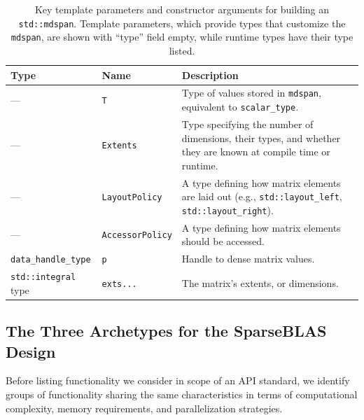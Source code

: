 \documentclass[manuscript,review]{acmart}
\begin{document}
\begin{table}[htbp]
  \centering
  \caption{Key template parameters and constructor arguments for building an \texttt{std::mdspan}. Template parameters, which provide types that customize the \texttt{mdspan}, are shown with ``type'' field empty, while runtime types have their type listed.}
  \label{tab:dense_param}
  \begin{tabularx}{\linewidth}{l l X}
    \toprule
    \textbf{Type} & \textbf{Name} & \textbf{Description} \\
    \midrule
    --- & \texttt{T} & Type of values stored in \texttt{mdspan}, equivalent to \texttt{scalar\_type}. \\
    --- & \texttt{Extents} & Type specifying the number of dimensions, their types, and whether they are known at compile time or runtime. \\
    --- & \texttt{LayoutPolicy} & A type defining how matrix elements are laid out (e.g., \texttt{std::layout\_left}, \texttt{std::layout\_right}). \\
    --- & \texttt{AccessorPolicy} & A type defining how matrix elements should be accessed. \\
    \addlinespace
    \texttt{data\_handle\_type} & \texttt{p} & Handle to dense matrix values. \\
    \texttt{std::integral} type & \texttt{exts...} & The matrix's extents, or dimensions. \\
    \bottomrule
  \end{tabularx}
\end{table}


\subsection{The Three Archetypes for the SparseBLAS Design}
\label{sec:archetype}
Before listing functionality we consider in scope of an API standard, we identify groups of functionality sharing the same characteristics in terms of computational complexity, memory requirements, and parallelization strategies. 
\end{document}
